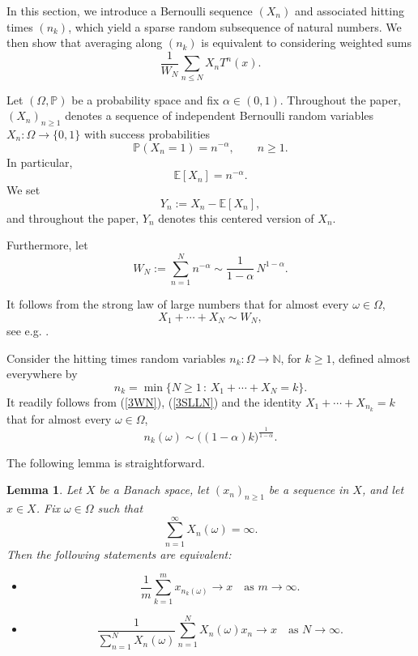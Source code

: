 \documentclass[12pt]{amsart}
\newcommand{\Ndb}{\mbox{$\mathbb{N}$}}
\newtheorem{lemma}[theorem]{Lemma}
\theoremstyle{remark}
\theoremstyle{definition}
\numberwithin{equation}{section}
\begin{document}
In this section, we introduce a Bernoulli sequence \((X_n)\) and associated hitting times \((n_k)\), which yield a sparse random subsequence of natural numbers. We then show that averaging along \((n_k)\) is equivalent to considering weighted sums
\[
\frac{1}{W_N}\sum_{n \leq N} X_n T^n(x).
\]

Let $(\Omega, \mathbb{P})$ be a probability space and fix $\alpha \in (0,1)$.  
Throughout the paper, $(X_n)_{n \ge 1}$ denotes a sequence of independent Bernoulli random variables 
$X_n \colon \Omega \to \{0,1\}$ with success probabilities
\[
\mathbb{P}(X_n = 1) = n^{-\alpha}, \qquad n \ge 1.
\]
In particular, 
\[
\mathbb{E}[X_n] = n^{-\alpha}.
\] 
We set
\[
Y_n := X_n - \mathbb{E}[X_n],
\]
and throughout the paper, $Y_n$ denotes this centered version of $X_n$.

Furthermore, let
\begin{equation}\label{3WN}
W_N := \sum_{n=1}^N n^{-\alpha} \sim \frac{1}{1-\alpha} \, N^{1-\alpha}.
\end{equation}

It follows from the strong law of large numbers that for almost every $\omega\in\Omega$, \begin{equation}\label{3SLLN} X_1+\cdots+X_N\sim W_N, \end{equation} see e.g. \cite[Appendix A]{FLW}.

Consider the hitting times random variables $n_k\colon\Omega\to\Ndb$, for $k\geq 1$, 
defined almost everywhere by 
$$ n_k=\min\bigl\{N\geq 1\, :\, X_1+\cdots +X_N =k\bigr\}. $$ It readily follows 
from (\ref{3WN}), (\ref{3SLLN}) and the identity $X_1+\cdots +X_{n_k}=k$ that for 
almost every $\omega\in\Omega$, 
$$
n_k(\omega)\sim \bigl((1-\alpha)k\bigr)^{\frac{1}{1-\alpha}}. 
$$


The following lemma is straightforward.

\begin{lemma}\label{3Equiv}
Let $X$ be a Banach space, let $(x_n)_{n \ge 1}$ be a sequence in $X$, and let $x \in X$.  
Fix $\omega \in \Omega$ such that
$$
\sum_{n=1}^\infty X_n(\omega) = \infty.
$$
Then the following statements are equivalent:
\begin{itemize}
\item[(i)] 
$$
\frac{1}{m} \sum_{k=1}^m x_{n_k(\omega)} \longrightarrow x \quad \text{as } m \to \infty.
$$
\item[(ii)] 
$$
\frac{1}{\sum_{n=1}^N X_n(\omega)} \sum_{n=1}^N X_n(\omega) x_n \longrightarrow x \quad \text{as } N \to \infty.
$$
\end{itemize}
\end{lemma}
\end{document}

